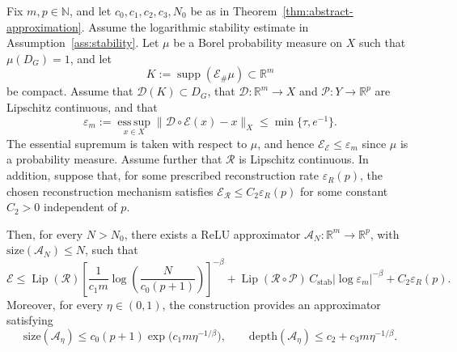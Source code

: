 \documentclass[10pt,a4paper]{amsart}
\newcommand{\Lip}{\operatorname{Lip}}
\begin{document}
	\begin{theorem}\label{thm:error-decomposition}
		Fix $m,p\in\mathbb N$, and let $c_0,c_1,c_2,c_3,N_0$ be as in Theorem~\ref{thm:abstract-approximation}. Assume the logarithmic stability estimate in Assumption~\ref{ass:stability}. Let $\mu$ be a Borel probability measure on $X$ such that $\mu(D_G)=1$, and let
		\begin{equation*}
			K:=\operatorname{supp}(\mathcal E_\#\mu)\subset \mathbb R^m
		\end{equation*}
		be compact. Assume that $\mathcal D(K)\subset D_G$, that $\mathcal D:\mathbb R^m\to X$ and $\mathcal P:Y\to\mathbb R^p$ are Lipschitz continuous, and that
		\begin{equation*}
			\varepsilon_m
			:=
			\operatorname*{ess\,sup}_{x\in X}
			\|\mathcal D\circ\mathcal E(x)-x\|_X
			\le \min\{\tau,e^{-1}\}.
		\end{equation*}
		The essential supremum is taken with respect to $\mu$, and hence $\mathscr E_{\mathcal E}\le\varepsilon_m$ since $\mu$ is a probability measure. Assume further that $\mathcal R$ is Lipschitz continuous. In addition, suppose that, for some prescribed reconstruction rate $\varepsilon_R(p)$, the chosen reconstruction mechanism satisfies $\mathscr E_{\mathcal R} \le C_2 \varepsilon_R(p)$ for some constant $C_2>0$ independent of $p$.
		
		Then, for every $N>N_0$, there exists a ReLU approximator
		$\mathcal A_N:\mathbb R^m\to\mathbb R^p$, with
		$\mathrm{size}(\mathcal A_N)\le N$, such that
		\begin{equation}\label{total-error}
			\mathscr E
			\le
			\Lip(\mathcal R)
			\left[
			\frac{1}{c_1m}
			\log\!\left(\frac{N}{c_0(p+1)}\right)
			\right]^{-\beta}
			+
			\Lip(\mathcal R\circ\mathcal P)\,C_{\mathrm{stab}}|\log\varepsilon_m|^{-\beta}
			+
			C_2\varepsilon_R(p).
		\end{equation}
		Moreover,
			for every $\eta\in(0,1)$, the construction provides an approximator satisfying
			\begin{equation*}
				\mathrm{size}(\mathcal A_\eta)
				\le c_0(p+1)\exp \bigl(c_1m\eta^{-1/\beta}\bigr),
				\qquad
				\mathrm{depth}(\mathcal A_\eta)
				\le c_2+c_3m\eta^{-1/\beta}.
			\end{equation*}
	\end{theorem}
\end{document}
